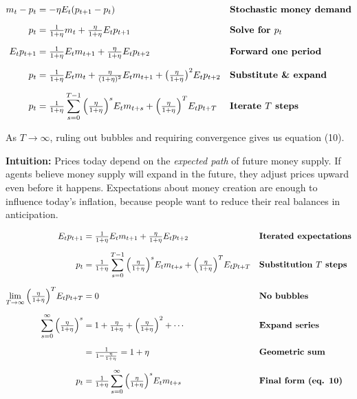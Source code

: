\documentclass[12pt]{article}
\begin{document}
\singlespacing
\begin{align}
m_t - p_t &= -\eta E_t(p_{t+1} - p_t) && \text{\textbf{Stochastic money demand}} \\[6pt]
p_t &= \tfrac{1}{1+\eta} m_t + \tfrac{\eta}{1+\eta} E_t p_{t+1} && \text{\textbf{Solve for $p_t$}} \\[6pt]
E_t p_{t+1} &= \tfrac{1}{1+\eta} E_t m_{t+1} + \tfrac{\eta}{1+\eta} E_t p_{t+2} && \text{\textbf{Forward one period}} \\[6pt]
p_t &= \tfrac{1}{1+\eta}E_t m_t + \tfrac{\eta}{(1+\eta)^2}E_t m_{t+1} + \big(\tfrac{\eta}{1+\eta}\big)^2 E_t p_{t+2} && \text{\textbf{Substitute \& expand}} \\[6pt]
p_t &= \tfrac{1}{1+\eta}\sum_{s=0}^{T-1}\Big(\tfrac{\eta}{1+\eta}\Big)^s E_t m_{t+s} 
     + \Big(\tfrac{\eta}{1+\eta}\Big)^T E_t p_{t+T} && \text{\textbf{Iterate $T$ steps}}
\end{align}


\noindent
As $T \to \infty$, ruling out bubbles and requiring convergence gives us equation (10).

\bigskip
\textbf{Intuition:}  
Prices today depend on the \textit{expected path} of future money supply. If agents believe money supply will expand in the future, they adjust prices upward even before it happens. Expectations about money creation are enough to influence today’s inflation, because people want to reduce their real balances in anticipation.

\singlespacing
\begin{align}
E_t p_{t+1} &= \tfrac{1}{1+\eta} E_t m_{t+1} + \tfrac{\eta}{1+\eta} E_t p_{t+2} && \text{\textbf{Iterated expectations}} \\[6pt]
p_t &= \tfrac{1}{1+\eta}\sum_{s=0}^{T-1}\Big(\tfrac{\eta}{1+\eta}\Big)^s E_t m_{t+s} 
      + \Big(\tfrac{\eta}{1+\eta}\Big)^T E_t p_{t+T} && \text{\textbf{Substitution $T$ steps}} \\[6pt]
\lim_{T\to\infty}\Big(\tfrac{\eta}{1+\eta}\Big)^T E_t p_{t+T} &= 0 && \text{\textbf{No bubbles}} \\[6pt]
\sum_{s=0}^{\infty}\Big(\tfrac{\eta}{1+\eta}\Big)^s 
 &= 1+\tfrac{\eta}{1+\eta}+\Big(\tfrac{\eta}{1+\eta}\Big)^2+\cdots && \text{\textbf{Expand series}} \\[6pt]
 &= \tfrac{1}{1-\frac{\eta}{1+\eta}} = 1+\eta && \text{\textbf{Geometric sum}} \\[6pt]
p_t &= \tfrac{1}{1+\eta}\sum_{s=0}^\infty \Big(\tfrac{\eta}{1+\eta}\Big)^s E_t m_{t+s} && \text{\textbf{Final form (eq. 10)}}
\end{align}
\end{document}
